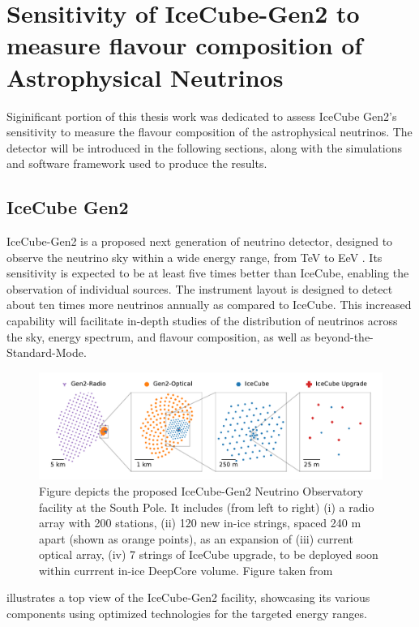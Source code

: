 \setchapterpreamble[u]{\margintoc}
\chapter{Sensitivity of IceCube-Gen2 to measure flavour composition of Astrophysical Neutrinos}
Siginificant portion of this thesis work was dedicated to assess IceCube Gen2's sensitivity to measure the flavour composition of the astrophysical neutrinos. The detector will be introduced in the following sections, along with the simulations and software framework used to produce the results. 

\section{IceCube Gen2} 
\label{sec:gen2-detector}
IceCube-Gen2 is a proposed next generation of neutrino detector, designed to observe the neutrino sky within a wide energy range, from TeV to EeV . Its sensitivity is expected to be at least five times better than IceCube, enabling the observation of individual sources. The instrument layout is designed to detect about ten times more neutrinos annually as compared to IceCube. This increased capability will facilitate in-depth studies of the distribution of neutrinos across the sky, energy spectrum, and flavour composition, as well as beyond-the-Standard-Mode.
\begin{figure}[h!]
	\includegraphics[scale=1.5]{./figures/gen2/decadal_survey_gen2-fan_radio_geometry.pdf}
	\caption{Figure depicts the proposed IceCube-Gen2 Neutrino Observatory facility at the South Pole. It includes (from left to right) (i) a radio array with 200 stations, (ii) 120 new in-ice strings, spaced 240 m apart (shown as orange points), as an expansion of (iii) current optical array, (iv) 7 strings of IceCube upgrade, to be deployed soon within currrent in-ice DeepCore volume. Figure taken from \cite{whitepaper}}
\end{figure}

 illustrates a top view of the IceCube-Gen2 facility, showcasing its various components using optimized technologies for the targeted energy ranges. 

